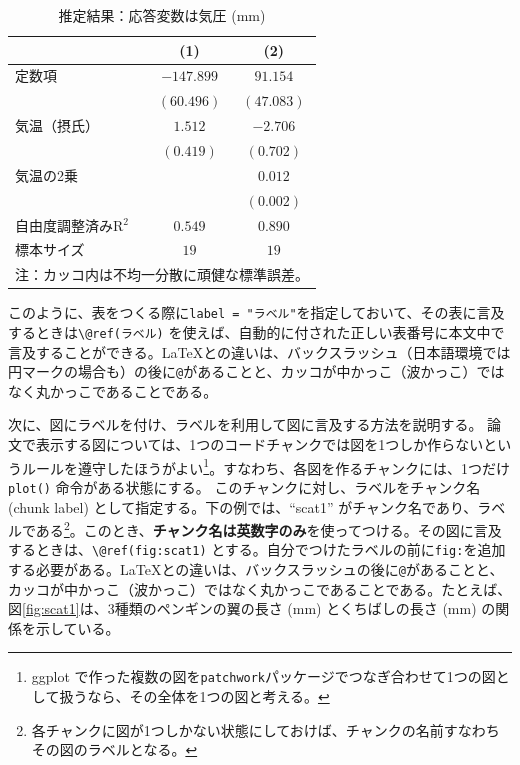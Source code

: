 \documentclass[10.5pt,a4paper,lualatex,ja=standard]{bxjsarticle}
\begin{document}
\begin{table}[t]
\caption{推定結果：応答変数は気圧 (mm)}
\begin{center}
\begin{tabular}{l c c}
\hline
 & (1) & (2) \\
\hline
定数項          & $-147.899$ & $91.154$   \\
             & $(60.496)$ & $(47.083)$ \\
気温（摂氏）       & $1.512$    & $-2.706$   \\
             & $(0.419)$  & $(0.702)$  \\
気温の2乗        &            & $0.012$    \\
             &            & $(0.002)$  \\
\hline
自由度調整済みR$^2$ & $0.549$    & $0.890$    \\
標本サイズ        & $19$       & $19$       \\
\hline
\multicolumn{3}{l}{\scriptsize{注：カッコ内は不均一分散に頑健な標準誤差。}}
\end{tabular}
\label{tab:reg1}
\end{center}
\end{table}

このように、表をつくる際に\texttt{label\ =\ "ラベル"}を指定しておいて、その表に言及するときは\texttt{\textbackslash{}@ref(ラベル)} を使えば、自動的に付された正しい表番号に本文中で言及することができる。\LaTeX との違いは、バックスラッシュ（日本語環境では円マークの場合も）の後に\texttt{@}があることと、カッコが中かっこ（波かっこ）ではなく丸かっこであることである。

次に、図にラベルを付け、ラベルを利用して図に言及する方法を説明する。
論文で表示する図については、1つのコードチャンクでは図を1つしか作らないというルールを遵守したほうがよい\footnote{ggplot で作った複数の図を\texttt{patchwork}パッケージでつなぎ合わせて1つの図として扱うなら、その全体を1つの図と考える。}。すなわち、各図を作るチャンクには、1つだけ\texttt{plot()} 命令がある状態にする。
このチャンクに対し、ラベルをチャンク名 (chunk label) として指定する。下の例では、``scat1'' がチャンク名であり、ラベルである\footnote{各チャンクに図が1つしかない状態にしておけば、チャンクの名前すなわちその図のラベルとなる。}。このとき、\textbf{チャンク名は英数字のみ}を使ってつける。その図に言及するときは、\texttt{\textbackslash{}@ref(fig:scat1)} とする。自分でつけたラベルの前に\texttt{fig:}を追加する必要がある。\LaTeX との違いは、バックスラッシュの後に\texttt{@}があることと、カッコが中かっこ（波かっこ）ではなく丸かっこであることである。たとえば、図\ref{fig:scat1}は、3種類のペンギンの翼の長さ (mm) とくちばしの長さ (mm) の関係を示している。
\end{document}
